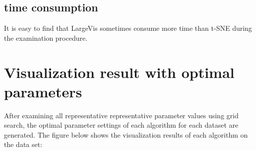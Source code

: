 \subsection{time consumption}

It is easy to find that LargeVis sometimes consume more time than t-SNE during the examination procedure. 




\section{Visualization result with optimal parameters}

After examining all representative representative parameter values using grid search, the optimal parameter settings of each algorithm for each dataset are generated. The figure below shows the visualization results of each algorithm on the data set:


